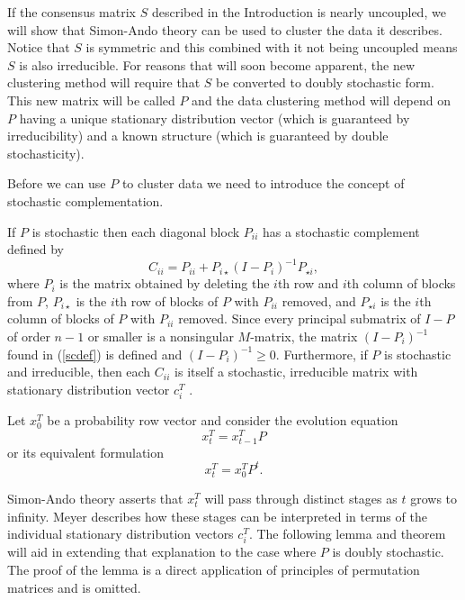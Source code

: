 \documentclass[final]{siamltex}
\begin{document}
If the consensus matrix $S$ described in the Introduction is nearly uncoupled, we will show that Simon-Ando theory can be used to cluster the data it describes. Notice that $S$ is symmetric and this combined with it not being uncoupled means $S$ is also irreducible. For reasons that will soon become apparent, the new clustering method will require that $S$ be converted to doubly stochastic form. This new matrix will be called $P$ and the data clustering method will depend on $P$ having a unique stationary distribution vector (which is guaranteed by irreducibility) and a known structure (which is guaranteed by double stochasticity).

Before we can use $P$ to cluster data we need to introduce the concept of stochastic complementation.

If $P$ is stochastic then each  diagonal block $P_{ii}$ has a stochastic complement defined by
\begin{equation} \label{scdef}
C_{ii}=P_{ii}+P_{i\star} \left(I-P_{i}\right)^{-1}P_{\star i},
\end{equation}
where $P_{i}$ is the matrix obtained by deleting the $i$th row and $i$th column of blocks from $P$, $P_{i \star}$ is the $i$th row of blocks of $P$ with $P_{ii}$ removed, and $P_{\star i}$ is the $i$th column of blocks of $P$ with $P_{ii}$ removed. Since every principal submatrix of $I-P$ of order $n-1$ or smaller is a nonsingular $M$-matrix, the matrix $(I-P_{i})^{-1}$ found in (\ref{scdef}) is defined and $(I-P_{i})^{-1} \ge 0$. Furthermore, if $P$ is stochastic and irreducible, then each $C_{ii}$ is itself a stochastic, irreducible matrix with stationary distribution vector $c_{i}^{T}$ \cite{berplem, meyer}.

Let $x_{0}^{T}$ be a probability row vector and consider the evolution equation
\begin{equation} \label{1}
x_{t}^{T} = x_{t-1}^{T}P 
\end{equation}
or its equivalent formulation 
\begin{equation} \label{2}
x_{t}^{T} = x_{0}^{T}P^{t}. 
\end{equation}

Simon-Ando theory asserts that $x_{t}^{T}$ will pass through distinct stages as $t$ grows to infinity. Meyer \cite{meyer} describes how these stages can be interpreted in terms of the individual stationary distribution vectors $c_{i}^{T}$. The following lemma and theorem will aid in extending that explanation to the case where $P$ is doubly stochastic. The proof of the lemma is a direct application of principles of permutation matrices and is omitted.
\end{document}
